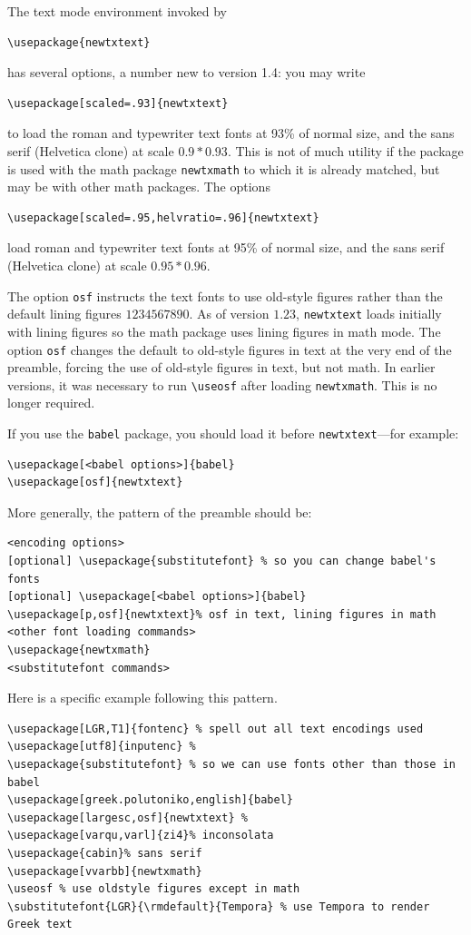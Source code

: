 \documentclass[11pt]{article}
\theoremstyle{oldplain}
\theoremstyle{plain}
\begin{document}
The text mode environment invoked by
\begin{verbatim}
\usepackage{newtxtext}
\end{verbatim}
has several options, a number new to version 1.4: you may write
\begin{verbatim}
\usepackage[scaled=.93]{newtxtext}
\end{verbatim}
to load the roman and typewriter text fonts at 93\% of normal size, and the sans serif (\textsf{Helvetica} clone) at scale $0.9*0.93$. This is not of much utility if the package is used with the math package {\tt newtxmath} to which it is already matched, but may be with other math packages. The options
\begin{verbatim}
\usepackage[scaled=.95,helvratio=.96]{newtxtext}
\end{verbatim}
load roman and typewriter text fonts at 95\% of normal size, and the sans serif (\textsf{Helvetica} clone) at scale $0.95*0.96$.

The option \texttt{osf} instructs the text fonts to use old-style figures  rather than the default lining figures $1234567890$. As of version $1.23$, {\tt newtxtext} loads initially with lining figures so the math package uses lining figures in math mode. The option {\tt osf} changes the default to old-style figures in text at the very end of the preamble, forcing the use of old-style figures in text, but not math. In earlier versions, it was necessary to run 
\verb|\useosf| after loading {\tt newtxmath}. This is no longer required. 

If you use the {\tt babel} package, you should load it before {\tt newtxtext}---for example:
\begin{verbatim}
\usepackage[<babel options>]{babel}
\usepackage[osf]{newtxtext}
\end{verbatim}
More generally, the pattern of the preamble should be:
\begin{verbatim}
<encoding options>
[optional] \usepackage{substitutefont} % so you can change babel's fonts
[optional] \usepackage[<babel options>]{babel}
\usepackage[p,osf]{newtxtext}% osf in text, lining figures in math
<other font loading commands>
\usepackage{newtxmath}
<substitutefont commands>
\end{verbatim}
Here is a specific example following this pattern.
\begin{verbatim}
\usepackage[LGR,T1]{fontenc} % spell out all text encodings used
\usepackage[utf8]{inputenc} % 
\usepackage{substitutefont} % so we can use fonts other than those in babel
\usepackage[greek.polutoniko,english]{babel}
\usepackage[largesc,osf]{newtxtext} % 
\usepackage[varqu,varl]{zi4}% inconsolata
\usepackage{cabin}% sans serif
\usepackage[vvarbb]{newtxmath}
\useosf % use oldstyle figures except in math
\substitutefont{LGR}{\rmdefault}{Tempora} % use Tempora to render Greek text
\end{verbatim}
\end{document}
